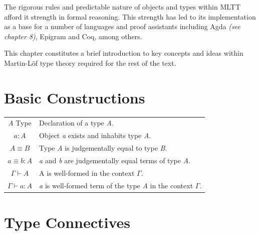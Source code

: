 \documentclass[12pt]{report}
\begin{document}
The rigorous rules and predictable nature of objects and types within MLTT afford it strength in formal reasoning. This strength has led to its implementation as a base for a number of languages and proof assistants including Agda \textit{(see chapter 8)}, Epigram and Coq, among others.

This chapter constitutes a brief introduction to key concepts and ideas within Martin-L\"of type theory required for the rest of the text.

\section{Basic Constructions}
\begin{center}
\begin{tabular}{c l}
\textit{A} Type & Declaration of a type \textit{A}.\\
$a : A$ & Object \textit{a} exists and inhabits type \textit{A}. \\
$A \equiv B$ & Type \textit{A} is judgementally equal to type \textit{B}.\\
$ a \equiv b : A$ & \textit{a} and \textit{b} are judgementally equal terms of type \textit{A}.\\
$\Gamma \vdash A$ & A is well-formed in the context $\Gamma$.\\
$\Gamma \vdash a:A$ & \textit{a} is well-formed term of the type \textit{A} in the context $\Gamma$.
\end{tabular}
\end{center}


\section{Type Connectives}
\end{document}
